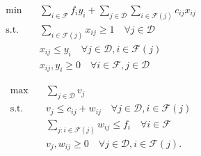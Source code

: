 \noindent \hspace*{-4ex}
\begin{minipage}[t]{.53\linewidth}
\begin{align*}
\min \quad & \sum_{i \in \mathcal{F}} f_i y_i + \sum_{j \in \mathcal{D}}  
\sum_{i \in \mathcal{F}(j)} c_{ij}x_{ij}  \tag{P} \label{primalLP} \\
\text{s.t.} \quad & \sum_{i \in \mathcal{F}(j)} x_{ij} \ge 1 \quad \forall {j \in \mathcal{D}} \\
& x_{ij} \le y_i    \quad \forall j \in \mathcal{D}, i \in \mathcal{F}(j)   \\
& x_{ij}, y_i \ge 0 \quad \forall {i \in \mathcal{F}}, j\in\mathcal{D}    %
\end{align*}
\end{minipage}
\quad
\begin{minipage}[t]{.5\linewidth}
\begin{align*}
\max \quad & \sum_{j \in \mathcal{D}} v_j \tag{D} \label{dualLP} \\
\text{s.t.} \quad & v_j \le c_{ij} + w_{ij} \quad \forall j \in \mathcal{D},i \in \mathcal{F}(j)\\
& \sum_{j: i \in \mathcal{F}(j)} w_{ij} \le f_i \quad \forall i \in \mathcal{F} \\
& v_j, w_{ij} \ge 0  \quad \forall j \in \mathcal{D}, i \in \mathcal{F}(j). %
\end{align*}
\end{minipage}

\medskip


